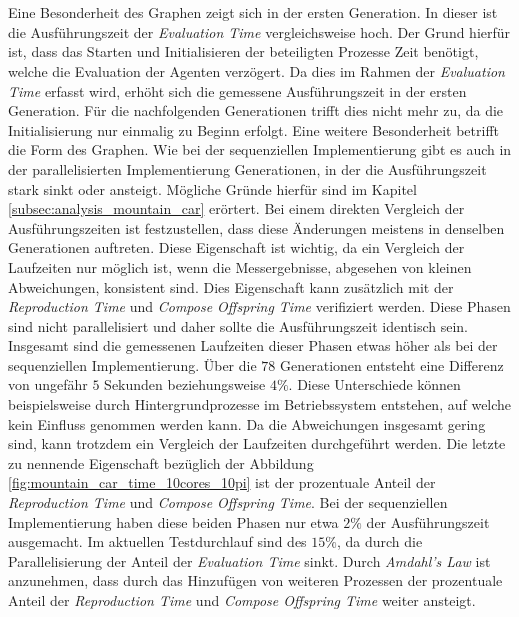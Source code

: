 \\\\
Eine Besonderheit des Graphen zeigt sich in der ersten Generation. In dieser ist die Ausführungszeit der \emph{Evaluation Time} vergleichsweise hoch. Der Grund hierfür ist, dass das Starten und Initialisieren der beteiligten Prozesse Zeit benötigt, welche die Evaluation der Agenten verzögert. Da dies im Rahmen der \emph{Evaluation Time} erfasst wird, erhöht sich die gemessene Ausführungszeit in der ersten Generation. Für die nachfolgenden Generationen trifft dies nicht mehr zu, da die Initialisierung nur einmalig zu Beginn erfolgt. Eine weitere Besonderheit betrifft die Form des Graphen. Wie bei der sequenziellen Implementierung gibt es auch in der parallelisierten Implementierung Generationen, in der die Ausführungszeit stark sinkt oder ansteigt. Mögliche Gründe hierfür sind im Kapitel \ref{subsec:analysis_mountain_car} erörtert. Bei einem direkten Vergleich der Ausführungszeiten ist festzustellen, dass diese Änderungen meistens in denselben Generationen auftreten. Diese Eigenschaft ist wichtig, da ein Vergleich der Laufzeiten nur möglich ist, wenn die Messergebnisse, abgesehen von kleinen Abweichungen, konsistent sind. Dies Eigenschaft kann zusätzlich mit der \emph{Reproduction Time} und \emph{Compose Offspring Time} verifiziert werden. Diese Phasen sind nicht parallelisiert und daher sollte die Ausführungszeit identisch sein. Insgesamt sind die gemessenen Laufzeiten dieser Phasen etwas höher als bei der sequenziellen Implementierung. Über die $78$ Generationen entsteht eine Differenz von ungefähr $5$ Sekunden beziehungsweise $4\%$. Diese Unterschiede können beispielsweise durch Hintergrundprozesse im Betriebssystem entstehen, auf welche kein Einfluss genommen werden kann. Da die Abweichungen insgesamt gering sind, kann trotzdem ein Vergleich der Laufzeiten durchgeführt werden. Die letzte zu nennende Eigenschaft bezüglich der Abbildung \ref{fig:mountain_car_time_10cores_10pi} ist der prozentuale Anteil der \emph{Reproduction Time} und \emph{Compose Offspring Time}. Bei der sequenziellen Implementierung haben diese beiden Phasen nur etwa $2\%$ der Ausführungszeit ausgemacht. Im aktuellen Testdurchlauf sind des $15\%$, da durch die Parallelisierung der Anteil der \emph{Evaluation Time} sinkt. Durch \emph{Amdahl's Law} ist anzunehmen, dass durch das Hinzufügen von weiteren Prozessen der prozentuale Anteil der \emph{Reproduction Time} und \emph{Compose Offspring Time} weiter ansteigt.
